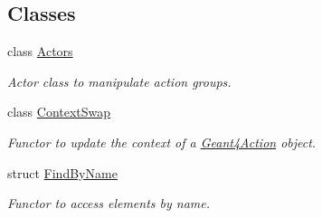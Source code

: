 \subsection*{Classes}
\begin{DoxyCompactItemize}
\item 
class \hyperlink{class_d_d4hep_1_1_simulation_1_1_geant4_action_1_1_actors}{Actors}
\begin{DoxyCompactList}\small\item\em Actor class to manipulate action groups. \item\end{DoxyCompactList}\item 
class \hyperlink{class_d_d4hep_1_1_simulation_1_1_geant4_action_1_1_context_swap}{ContextSwap}
\begin{DoxyCompactList}\small\item\em Functor to update the context of a \hyperlink{class_d_d4hep_1_1_simulation_1_1_geant4_action}{Geant4Action} object. \item\end{DoxyCompactList}\item 
struct \hyperlink{struct_d_d4hep_1_1_simulation_1_1_geant4_action_1_1_find_by_name}{FindByName}
\begin{DoxyCompactList}\small\item\em Functor to access elements by name. \item\end{DoxyCompactList}\end{DoxyCompactItemize}
